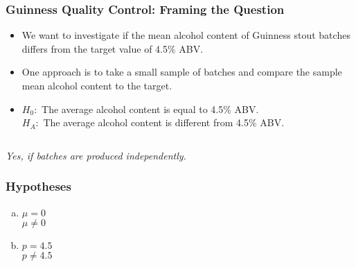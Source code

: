 \documentclass[slidestop,compress,mathserif]{beamer}
\newcommand{\soln}[1]{\textit{#1}}
\begin{document}


\begin{frame}
\frametitle{Guinness Quality Control: Framing the Question}

\begin{itemize}
\item We want to investigate if the mean alcohol content of Guinness stout batches differs from the target value of 4.5\% ABV.
\pause
\item One approach is to take a small sample of batches and compare the sample mean alcohol content to the target.
\pause
\item $H_0:$ The average alcohol content is equal to 4.5\% ABV. \\
$H_A:$ The average alcohol content is different from 4.5\% ABV.
\pause
\end{itemize}

$\:$ \\


\soln{\pause Yes, if batches are produced independently.}

\end{frame}


\begin{frame}
\frametitle{Hypotheses}


\begin{enumerate}[(a)]
\item  {} $\mu = 0$ \\
 $\mu \ne 0$
\item  {} $p = 4.5$ \\
 $p \ne 4.5$
\end{enumerate}

\end{frame}

\end{document}
